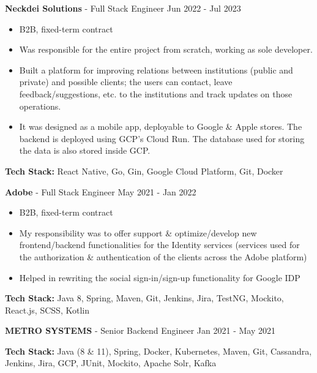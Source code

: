 \documentclass[11pt]{article}
\newcommand{\job}[3]{
    \begingroup
        \textbf{\small#1} - \small#2
        \hfill\color{black!70}\small{#3}
    \endgroup
}
\newcommand{\spacevv}{
    \vspace{2mm}
}
\begin{document}
\begin{paracol}{2}
{      \job{Neckdei Solutions}{Full Stack Engineer}{Jun 2022 - Jul 2023}
      \begin{itemize}
          \item B2B, fixed-term contract
          \item Was responsible for the entire project from scratch, working as sole developer.
          \item Built a platform for improving relations between institutions (public and private) and possible clients; the users can contact, leave feedback/suggestions, etc. to the institutions and track updates on those operations.
          \item It was designed as a mobile app, deployable to Google \& Apple stores. The backend is deployed using GCP's Cloud Run. The database used for storing the data is also stored inside GCP.
      \end{itemize}
      \item \textbf{Tech Stack:} React Native, Go, Gin, Google Cloud Platform, Git, Docker
      \spacevv
      \spacevv
      \spacevv

      \job{Adobe}{Full Stack Engineer}{May 2021 - Jan 2022}
      \begin{itemize}
        \item B2B, fixed-term contract
        \item My responsibility was to offer support \& optimize/develop new frontend/backend functionalities for the Identity services (services used for the authorization \& authentication of the clients across the Adobe platform)
        \item Helped in rewriting the social sign-in/sign-up functionality for Google IDP
      \end{itemize}
      \item \textbf{Tech Stack:} Java 8, Spring, Maven, Git, Jenkins, Jira, TestNG, Mockito, React.js, SCSS, Kotlin
      \spacevv
      \spacevv
      \spacevv

      \job{METRO SYSTEMS}{Senior Backend Engineer}{Jan 2021 - May 2021}
      \item \textbf{Tech Stack:} Java (8 \& 11), Spring, Docker, Kubernetes, Maven, Git, Cassandra, Jenkins, Jira, GCP, JUnit, Mockito, Apache Solr, Kafka
      \spacevv
      \spacevv
      \spacevv

}
\end{paracol}
\end{document}
